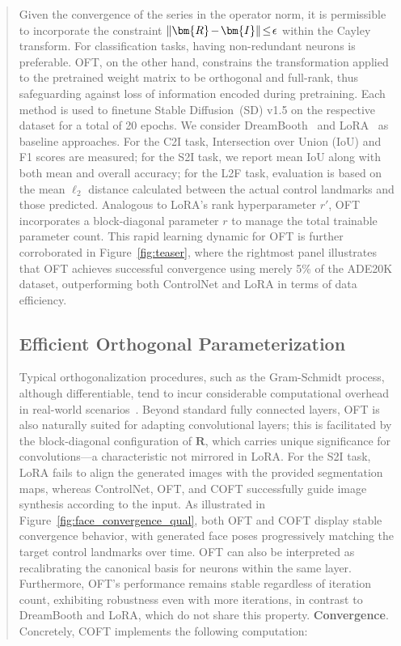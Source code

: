 \begin{itemize}[leftmargin=*,nosep]
\begin{abstract}
Given the convergence of the series in the operator norm, it is permissible to incorporate the constraint $\thickmuskip=2mu \medmuskip=2mu\|\bm{R}-\bm{I}\|\leq\epsilon$ within the Cayley transform. For classification tasks, having non-redundant neurons is preferable. OFT, on the other hand, constrains the transformation applied to the pretrained weight matrix to be orthogonal and full-rank, thus safeguarding against loss of information encoded during pretraining. Each method is used to finetune Stable Diffusion~(SD) v1.5 on the respective dataset for a total of 20 epochs. We consider DreamBooth~\cite{ruiz2023dreambooth} and LoRA~\cite{hulora2022} as baseline approaches. For the C2I task, Intersection over Union (IoU) and F1 scores are measured; for the S2I task, we report mean IoU along with both mean and overall accuracy; for the L2F task, evaluation is based on the mean $\ell_2$ distance calculated between the actual control landmarks and those predicted. Analogous to LoRA's rank hyperparameter $r'$, OFT incorporates a block-diagonal parameter $r$ to manage the total trainable parameter count. This rapid learning dynamic for OFT is further corroborated in Figure~\ref{fig:teaser}, where the rightmost panel illustrates that OFT achieves successful convergence using merely 5\% of the ADE20K dataset, outperforming both ControlNet and LoRA in terms of data efficiency. \subsection{Efficient Orthogonal Parameterization}\label{sect:eff_ortho}

Typical orthogonalization procedures, such as the Gram-Schmidt process, although differentiable, tend to incur considerable computational overhead in real-world scenarios~\cite{liu2021orthogonal}. Beyond standard fully connected layers, OFT is also naturally suited for adapting convolutional layers; this is facilitated by the block-diagonal configuration of $\bm{R}$, which carries unique significance for convolutions—a characteristic not mirrored in LoRA. For the S2I task, LoRA fails to align the generated images with the provided segmentation maps, whereas ControlNet, OFT, and COFT successfully guide image synthesis according to the input. As illustrated in Figure~\ref{fig:face_convergence_qual}, both OFT and COFT display stable convergence behavior, with generated face poses progressively matching the target control landmarks over time. OFT can also be interpreted as recalibrating the canonical basis for neurons within the same layer. Furthermore, OFT’s performance remains stable regardless of iteration count, exhibiting robustness even with more iterations, in contrast to DreamBooth and LoRA, which do not share this property. \textbf{Convergence}. Concretely, COFT implements the following computation:


\end{abstract}
\end{itemize}
